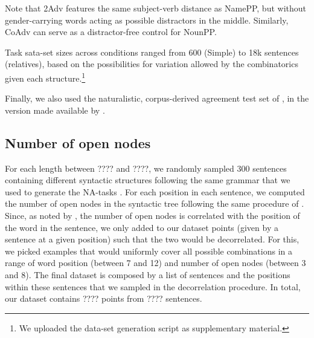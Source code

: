  Note that 2Adv features the same subject-verb
distance as NamePP, but without gender-carrying words acting as
possible distractors in the middle. Similarly, CoAdv can serve as a
distractor-free control for NounPP.

Task sata-set sizes across conditions ranged from 600 (Simple) to 18k sentences (relatives),
based on the possibilities for variation allowed by the combinatorics
given each structure.\footnote{We uploaded the data-set generation
  script as supplementary material.}

Finally, we also used the naturalistic, corpus-derived agreement test set of , in the version made available by .

\subsection{Number of open nodes}\label{ssec:n_opennodes}

For each length between ???? and ????, we randomly sampled 300 sentences
containing different syntactic structures following the same grammar that we
used to generate the NA-tasks . For each position in each sentence, we computed
the number of open nodes in the syntactic tree following the same procedure of
. Since, as noted by , the
number of open nodes is correlated with the position of the word in the
sentence, we only added to our dataset points (given by a sentence at a given
position) such that the two would be decorrelated.  For this, we picked
examples that would uniformly cover all possible combinations in a range of
word position (between 7 and 12) and number of open nodes (between 3 and 8).
The final dataset is composed by a list of sentences and the positions
within these sentences that we sampled in the decorrelation procedure. In
total, our dataset contains ???? points from ???? sentences.
